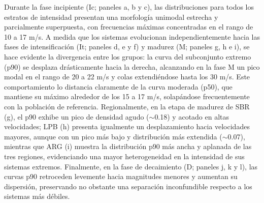 Durante la fase incipiente (Ic; paneles a, b y c), las distribuciones para todos los estratos de intensidad presentan una morfología unimodal estrecha y parcialmente superpuesta, con frecuencias máximas concentradas en el rango de 10 a 17 m/s. A medida que los sistemas evolucionan independientemente hacia las fases de intensificación (It; paneles d, e y f) y madurez (M; paneles g, h e i), se hace evidente la divergencia entre los grupos: la curva del subconjunto extremo (p90) se desplaza drásticamente hacia la derecha, alcanzando en la fase M un pico modal en el rango de 20 a 22 m/s y colas extendi\'endose hasta los 30 m/s. Este comportamiento lo distancia claramente de la curva moderada (p50), que mantiene su máximo alrededor de los 15 a 17 m/s, solapándose frecuentemente con la población de referencia. Regionalmente, en la etapa de madurez de SBR (g), el p90 exhibe un pico de densidad
agudo ($\sim$0.18) y acotado en altas velocidades; LPB (h) presenta igualmente un desplazamiento hacia velocidades mayores, aunque con un pico m\'as bajo y distribuci\'on m\'as extendida ($\sim$0.07), mientras que ARG (i) muestra la distribuci\'on p90 m\'as ancha y aplanada de las tres regiones, evidenciando una mayor heterogeneidad en la intensidad de sus sistemas extremos. Finalmente, en la fase de decaimiento (D; paneles j, k y l), las curvas p90 retroceden levemente hacia magnitudes menores y aumentan su dispersión, preservando no obstante una separación inconfundible respecto a los sistemas más débiles.


